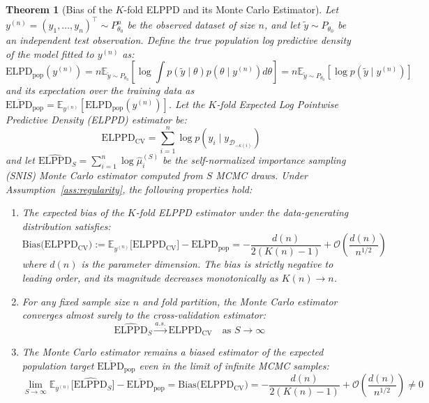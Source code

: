 \documentclass[12pt]{article}
\newtheorem{theorem}{Theorem}
\begin{document}
\begin{theorem}[Bias of the $K$-fold ELPPD and its Monte Carlo Estimator]\label{thm:cv_bias}
Let $y^{(n)} = (y_1, \dots, y_n)^\top \sim P_{\theta_0}^n$ be the observed dataset of size $n$, and let $\tilde{y} \sim P_{\theta_0}$ be an independent test observation.
Define the true population log predictive density of the model fitted to $y^{(n)}$ as:
\begin{equation}
\text{ELPD}_{\text{pop}}(y^{(n)}) = n \mathbb{E}_{\tilde{y} \sim P_{\theta_0}} \left[ \log \int p(\tilde{y} \mid \theta) p(\theta \mid y^{(n)}) d\theta \right] = n \mathbb{E}_{\tilde{y} \sim P_{\theta_0}} \left[ \log p(\tilde{y} \mid y^{(n)}) \right]
\end{equation}
and its expectation over the training data as $\overline{\text{ELPD}}_{\text{pop}} = \mathbb{E}_{y^{(n)}} \left[ \text{ELPD}_{\text{pop}}(y^{(n)}) \right]$.
Let the $K$-fold Expected Log Pointwise Predictive Density (ELPPD) estimator be:
\begin{equation}
\text{ELPPD}_{\text{CV}} = \sum_{i=1}^n \log p(y_i \mid y_{\mathcal{D}_{-\kappa(i)}})
\end{equation}
and let $\widehat{\text{ELPPD}}_S = \sum_{i=1}^n \log \widehat{\mu}_i^{(S)}$ be the self-normalized importance sampling (SNIS) Monte Carlo estimator computed from $S$ MCMC draws.
Under Assumption~\ref{ass:regularity}, the following properties hold:
\begin{enumerate}
    \item The expected bias of the $K$-fold ELPPD estimator under the data-generating distribution satisfies:
    \begin{equation}
    \text{Bias}\big(\text{ELPPD}_{\text{CV}}\big) := \mathbb{E}_{y^{(n)}}\big[\text{ELPPD}_{\text{CV}}\big] - \overline{\text{ELPD}}_{\text{pop}} = -\frac{d(n)}{2(K(n)-1)} + \mathcal{O}\left( \frac{d(n)}{n^{1/2}} \right)
    \end{equation}
    where $d(n)$ is the parameter dimension. The bias is strictly negative to leading order, and its magnitude decreases monotonically as $K(n) \to n$.
    \item For any fixed sample size $n$ and fold partition, the Monte Carlo estimator converges almost surely to the cross-validation estimator:
    \begin{equation}
    \widehat{\text{ELPPD}}_S \xrightarrow{a.s.} \text{ELPPD}_{\text{CV}} \quad \text{as } S \to \infty
    \end{equation}
    \item The Monte Carlo estimator remains a biased estimator of the expected population target $\overline{\text{ELPD}}_{\text{pop}}$ even in the limit of infinite MCMC samples:
    \begin{equation}
    \lim_{S \to \infty} \mathbb{E}_{y^{(n)}}\big[\widehat{\text{ELPPD}}_S\big] - \overline{\text{ELPD}}_{\text{pop}} = \text{Bias}\big(\text{ELPPD}_{\text{CV}}\big) = -\frac{d(n)}{2(K(n)-1)} + \mathcal{O}\left( \frac{d(n)}{n^{1/2}} \right) \neq 0
    \end{equation}
\end{enumerate}
\end{theorem}
\end{document}
